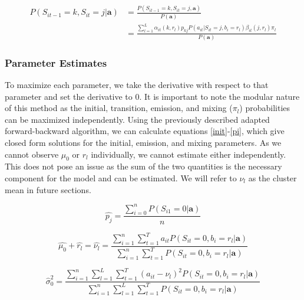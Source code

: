 \documentclass{article}
\begin{document}
\begin{equation}\label{probstran}
\begin{split}
    P(S_{it-1}=k,S_{it}=j|\textbf{a}) & = 
        \frac{P(S_{it-1}=k,S_{it}=j,\textbf{a})}{P(\textbf{a})} \\
    & = \frac{\sum^L_{l=1}\alpha_{it}(k,r_l) p_{kj} P(a_{it}|S_{it}=j, b_i=r_l)
        \beta_{it}(j,r_l)\pi_l }{P(\textbf{a})} 
\end{split}
\end{equation}



\subsubsection{Parameter Estimates}

 To maximize each parameter, we take the derivative with respect 
 to that parameter and set the derivative to 0. It is important 
 to note the modular nature of this method as the initial, 
 transition, emission, and mixing ($\pi_l$) probabilities can 
 be maximized independently. Using the previously described 
 adapted forward-backward algorithm, we can calculate equations 
 \ref{init}-\ref{pi}, which give closed form solutions for the 
 initial, emission, and mixing parameters. As we cannot observe 
 $\mu_0$ or $r_l$ individually, we cannot estimate either independently. 
 This does not pose an issue as the sum of the two quantities is 
 the necessary component for the model and can be estimated. We 
 will refer to $\nu_l$ as the cluster mean in future sections. 

\begin{equation}\label{init}
    \hat{p_j}  = \frac{\sum^n_{i=0} P(S_{i1}=0|\textbf{a})}{n}
\end{equation} 

\begin{equation}\label{mu0}
    \hat{\mu_0} + \hat{r_l} = \hat{\nu_l} = 
    \frac{\sum_{i=1}^n \sum_{t=1}^T a_{it}P(S_{it}=0,b_{i}=r_l|\textbf{a})}
    {\sum_{i=1}^n \sum_{t=1}^T P(S_{it}=0,b_{i}=r_l|\textbf{a})}
\end{equation} 

\begin{equation}\label{sig0}
    \hat{\sigma}_0^2 = 
    \frac{\sum_{i=1}^n \sum_{l=1}^L \sum_{t=1}^T 
        (a_{it}-\nu_l)^2 P(S_{it}=0,b_{i}=r_l|\textbf{a})}
        {\sum_{i=1}^n \sum_{l=1}^L \sum_{t=1}^T P(S_{it}=0,b_{i}=r_l|\textbf{a})}
\end{equation} 
\end{document}

